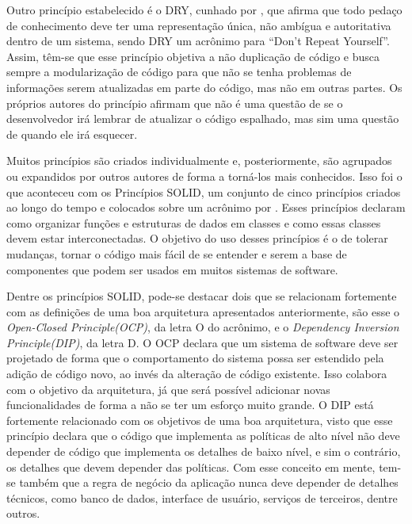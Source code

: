 \documentclass[12pt, %
openright, 
oneside, %
a4paper,    %
brazil]{facom-ufu-abntex2}
\begin{document}
Outro princípio estabelecido é o DRY, cunhado por , que afirma que todo pedaço de conhecimento deve ter uma representação única, não ambígua e autoritativa dentro de um sistema, sendo DRY um acrônimo para ``Don't Repeat Yourself''. Assim, têm-se que esse princípio objetiva a não duplicação de código e busca sempre a modularização de código para que não se tenha problemas de informações serem atualizadas em parte do código, mas não em outras partes. Os próprios autores do princípio afirmam que não é uma questão de se o desenvolvedor irá lembrar de atualizar o código espalhado, mas sim uma questão de quando ele irá esquecer.

Muitos princípios são criados individualmente e, posteriormente, são agrupados ou expandidos por outros autores de forma a torná-los mais conhecidos. Isso foi o que aconteceu com os Princípios SOLID, um conjunto de cinco princípios criados ao longo do tempo e colocados sobre um acrônimo por . Esses princípios declaram como organizar funções e estruturas de dados em classes e como essas classes devem estar interconectadas. O objetivo do uso desses princípios é o de tolerar mudanças, tornar o código mais fácil de se entender e serem a base de componentes que podem ser usados em muitos sistemas de software.

Dentre os princípios SOLID, pode-se destacar dois que se relacionam fortemente com as definições de uma boa arquitetura apresentados anteriormente, são esse o \textit{Open-Closed Principle(OCP)}, da letra O do acrônimo, e o \textit{Dependency Inversion Principle(DIP)}, da letra D. O OCP declara que um sistema de software deve ser projetado de forma que o comportamento do sistema possa ser estendido pela adição de código novo, ao invés da alteração de código existente. Isso colabora com o objetivo da arquitetura, já que será possível adicionar novas funcionalidades de forma a não se ter um esforço muito grande. O DIP está fortemente relacionado com os objetivos de uma boa arquitetura, visto que esse princípio declara que o código que implementa as políticas de alto nível não deve depender de código que implementa os detalhes de baixo nível, e sim o contrário, os detalhes que devem depender das políticas. Com esse conceito em mente, tem-se também que a regra de negócio da aplicação nunca deve depender de detalhes técnicos, como banco de dados, interface de usuário, serviços de terceiros, dentre outros.
\end{document}
